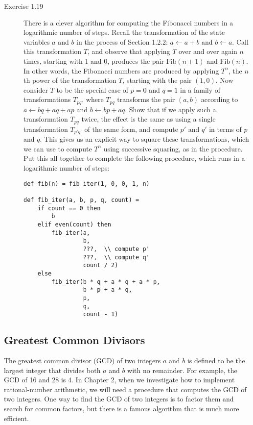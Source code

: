 \begin{description}
\item[Exercise 1.19] There is a clever algorithm for computing the Fibonacci numbers in a logarithmic number of steps. Recall the transformation of the state variables $a$ and $b$ in the  process of Section 1.2.2: $a \leftarrow a + b$ and $b \leftarrow a$. Call this transformation $T$, and observe that applying $T$ over and over again $n$ times, starting with 1 and 0, produces the pair $\text{Fib}(n + 1)$ and $\text{Fib}(n)$. In other words, the Fibonacci numbers are produced by applying $T^n$, the $n$th power of the transformation $T$, starting with the pair $(1,0)$. Now consider $T$ to be the special case of $p = 0$ and $q = 1$ in a family of transformations $T_{pq}$, where $T_{pq}$ transforms the pair $(a,b)$ according to $a \leftarrow bq + aq + ap$ and $b \leftarrow bp + aq$. Show that if we apply such a transformation $T_{pq}$ twice, the effect is the same as using a single transformation $T_{p'q'}$ of the same form, and compute $p'$ and $q'$ in terms of $p$ and $q$. This gives us an explicit way to square these transformations, which we can use to compute $T^n$ using successive squaring, as in the  procedure. Put this all together to complete the following procedure, which runs in a logarithmic number of steps:

\begin{lstlisting}
def fib(n) = fib_iter(1, 0, 0, 1, n)

def fib_iter(a, b, p, q, count) =
    if count == 0 then
        b
    elif even(count) then
        fib_iter(a,
                 b,
                 ???,  \\ compute p'
                 ???,  \\ compute q'
                 count / 2)
    else
        fib_iter(b * q + a * q + a * p,
                 b * p + a * q,
                 p,
                 q,
                 count - 1)
\end{lstlisting}
\end{description}

\subsection{Greatest Common Divisors}

The greatest common divisor (GCD) of two integers $a$ and $b$ is defined to be the largest integer that divides both $a$ and $b$ with no remainder. For example, the GCD of 16 and 28 is 4. In Chapter 2, when we investigate how to implement rational-number arithmetic, we will need a procedure that computes the GCD of two integers. One way to find the GCD of two integers is to factor them and search for common factors, but there is a famous algorithm that is much more efficient.

